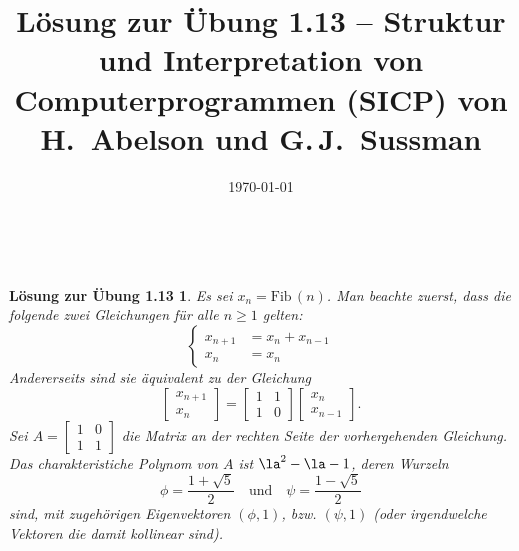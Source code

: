 \documentclass[a4paper,11pt,reqno]{amsart}
\theoremstyle{uremark}
\newtheorem*{loes}{L\"osung zur \"Ubung 1.13}
\begin{document}
\title[]{L\"osung zur \"Ubung 1.13 -- Struktur und Interpretation von
Computerprogrammen (SICP) von H.~Abelson und G.\,J.~Sussman}
\author{\href{https://github.com/pzuehlke}{}}
\date{\today}
\maketitle
\


\begin{loes} 
    Es sei $ x_n = \text{Fib}\,(n) $. Man beachte zuerst, dass die folgende
    zwei Gleichungen f\"ur alle $ n \ge 1 $ gelten:
    \begin{equation*}%
        \begin{cases}
            x_{n + 1} & = x_{n} + x_{n - 1} \\
            x_n & = x_n
        \end{cases}
    \end{equation*}
    Andererseits sind sie \"aquivalent zu der Gleichung
    \begin{equation*}%
        \begin{bmatrix}
            x_{n + 1} \\
            x_n
        \end{bmatrix} =\begin{bmatrix}
            1 & 1 \\
            1 & 0 
        \end{bmatrix}
        \begin{bmatrix}
            x_n \\
            x_{n - 1}
        \end{bmatrix}.
        \end{equation*}
        Sei $ A = \begin{bmatrix}
            1 & 0 \\
            1 & 1 
        \end{bmatrix} $ die Matrix an der rechten Seite der vorhergehenden
        Gleichung. Das
        charakteristiche Polynom von $ A $ ist $ \la^2 - \la - 1 $, deren
        Wurzeln
        \begin{equation*}%
            \phi = \frac{1 + \sqrt{5}}{2} \quad \text{und} \quad \psi = \frac{1
            - \sqrt{5}}{2}
        \end{equation*}
        sind, mit zugeh\"origen Eigenvektoren $ (\phi, 1) $, bzw. $ (\psi, 1) $
        (oder irgendwelche Vektoren die damit kollinear sind).


\end{loes}
\end{document}
